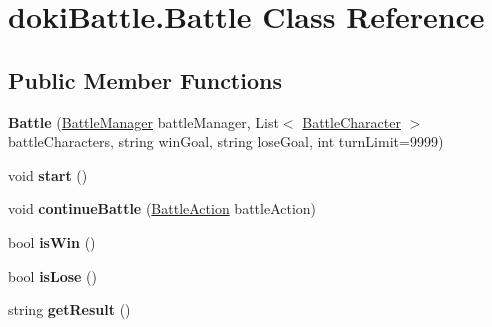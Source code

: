 \hypertarget{classdoki_battle_1_1_battle}{}\section{doki\+Battle.\+Battle Class Reference}
\label{classdoki_battle_1_1_battle}
\subsection*{Public Member Functions}
\begin{DoxyCompactItemize}
\item 
{\bfseries Battle} (\hyperlink{classdoki_battle_1_1_battle_manager}{Battle\+Manager} battle\+Manager, List$<$ \hyperlink{classdoki_battle_1_1_battle_character}{Battle\+Character} $>$ battle\+Characters, string win\+Goal, string lose\+Goal, int turn\+Limit=9999)\hypertarget{classdoki_battle_1_1_battle_a8b2392d61c912656b7d43c7b84581fba}{}\label{classdoki_battle_1_1_battle_a8b2392d61c912656b7d43c7b84581fba}

\item 
void {\bfseries start} ()\hypertarget{classdoki_battle_1_1_battle_a7e1c71011064b73a852ea3c3f557fbd8}{}\label{classdoki_battle_1_1_battle_a7e1c71011064b73a852ea3c3f557fbd8}

\item 
void {\bfseries continue\+Battle} (\hyperlink{classdoki_battle_1_1_battle_action}{Battle\+Action} battle\+Action)\hypertarget{classdoki_battle_1_1_battle_af5a649b1433fcc9ea8a54c36677f418b}{}\label{classdoki_battle_1_1_battle_af5a649b1433fcc9ea8a54c36677f418b}

\item 
bool {\bfseries is\+Win} ()\hypertarget{classdoki_battle_1_1_battle_af8a6fc47d9ae12b240519998bc5543d3}{}\label{classdoki_battle_1_1_battle_af8a6fc47d9ae12b240519998bc5543d3}

\item 
bool {\bfseries is\+Lose} ()\hypertarget{classdoki_battle_1_1_battle_af74df0209afebef3639cd78b54ede3b4}{}\label{classdoki_battle_1_1_battle_af74df0209afebef3639cd78b54ede3b4}

\item 
string {\bfseries get\+Result} ()\hypertarget{classdoki_battle_1_1_battle_a207a592fc1ff8b48a8378350df5b3e8c}{}\label{classdoki_battle_1_1_battle_a207a592fc1ff8b48a8378350df5b3e8c}

\end{DoxyCompactItemize}

